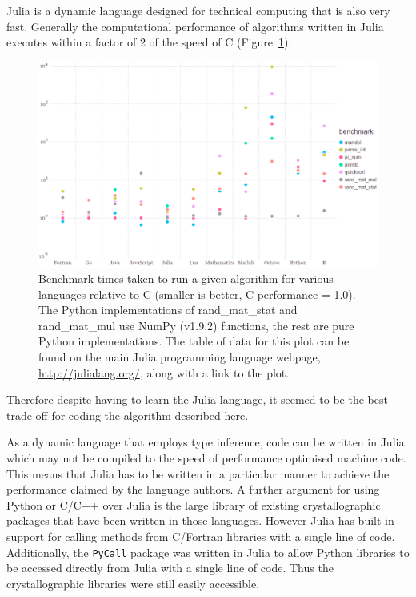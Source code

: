 Julia is a dynamic language designed for technical computing \cite{bezanson2014julia,bezanson2012julia} that is also very fast.
Generally the computational performance of algorithms written in Julia executes within a factor of 2 of the speed of C (Figure~\ref{fig:Language performance benchmarks}).
\begin{figure}[ht!]
    \centering
    \includegraphics[width=1.0\textwidth]{figures/datared/language_benchmarks.png}
    \caption[Benchmark times taken to run a given algorithm for various languages relative to C.]{Benchmark times taken to run a given algorithm for various languages relative to C (smaller is better, C performance = 1.0).
    The Python implementations of rand\_mat\_stat and rand\_mat\_mul use NumPy (v1.9.2) functions, the rest are pure Python implementations.
    The table of data for this plot can be found on the main Julia programming language webpage, \url{http://julialang.org/}, along with a link to the plot.}
    \label{fig:Language performance benchmarks}
\end{figure}
Therefore despite having to learn the Julia language, it seemed to be the best trade-off for coding the algorithm described here.

As a dynamic language that employs type inference, code can be written in Julia which may not be compiled to the speed of performance optimised machine code.
This means that Julia has to be written in a particular manner to achieve the performance claimed by the language authors.
A further argument for using Python or C/C++ over Julia is the large library of existing crystallographic packages that have been written in those languages.
However Julia has built-in support for calling methods from C/Fortran libraries with a single line of code.
Additionally, the \verb+PyCall+ package was written in Julia to allow Python libraries to be accessed directly from Julia with a single line of code.
Thus the crystallographic libraries were still easily accessible.

